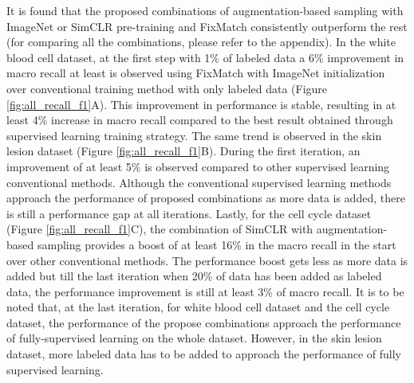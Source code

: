It is found that the proposed combinations of augmentation-based sampling with ImageNet or SimCLR pre-training and FixMatch consistently outperform the rest (for comparing all the combinations, please refer to the appendix).
In the white blood cell dataset, at the first step with 1\% of labeled data a 6\% improvement in macro recall at least is observed using FixMatch with ImageNet initialization over conventional training method with only labeled data (Figure \ref{fig:all_recall_f1}A). This improvement in performance is stable, resulting in at least 4\% increase in macro recall compared to the best result obtained through supervised learning training strategy. The same trend is observed in the skin lesion dataset (Figure \ref{fig:all_recall_f1}B). During the first iteration, an improvement of at least 5\% is observed compared to other supervised learning conventional methods. Although the conventional supervised learning methods approach the performance of proposed combinations as more data is added, there is still a performance gap at all iterations. Lastly, for the cell cycle dataset (Figure \ref{fig:all_recall_f1}C), the combination of SimCLR with augmentation-based sampling provides a boost of at least 16\% in the macro recall in the start over other conventional methods. The performance boost gets less as more data is added but till the last iteration when 20\% of data has been added as labeled data, the performance improvement is still at least 3\% of macro recall. 
It is to be noted that, at the last iteration, for white blood cell dataset and the cell cycle dataset, the performance of the propose combinations approach the performance of fully-supervised learning on the whole dataset. However, in the skin lesion dataset, more labeled data has to be added to approach the performance of fully supervised learning. 


